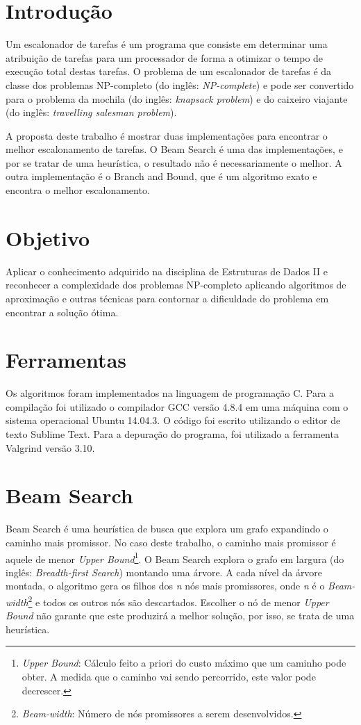 \documentclass[a4paper,12pt]{article}
\begin{document}
\section{Introdução} %

Um escalonador de tarefas é um programa que consiste em determinar uma atribuição de tarefas para um processador
de forma a otimizar o tempo de execução total destas tarefas. O problema de um escalonador de tarefas é da classe dos 
problemas NP-completo (do inglês: \textit{NP-complete}) e pode ser convertido para o problema da 
mochila (do inglês: \textit{knapsack problem}) e do caixeiro viajante (do inglês: \textit{travelling salesman problem}).

A proposta deste trabalho é mostrar duas implementações para encontrar o melhor escalonamento de tarefas. O Beam Search 
é uma das implementações, e por se tratar de uma heurística, o resultado não é necessariamente o melhor. A outra 
implementação é o Branch and Bound, que é um algoritmo exato e encontra o melhor escalonamento.

\section{Objetivo}
Aplicar o conhecimento adquirido na disciplina de Estruturas de Dados II e reconhecer a complexidade dos 
problemas NP-completo aplicando algoritmos de aproximação e outras técnicas para contornar a dificuldade do 
problema em encontrar a solução ótima.

\section{Ferramentas}
Os algoritmos foram implementados na linguagem de programação C. Para a compilação foi 
utilizado o compilador GCC versão 4.8.4 em uma máquina com o sistema operacional Ubuntu 14.04.3.
O código foi escrito utilizando o editor de texto Sublime Text.
Para a depuração do programa, foi utilizado a ferramenta Valgrind versão 3.10.


\section{Beam Search}
Beam Search é uma heurística de busca que explora um grafo expandindo o caminho mais promissor. No caso deste 
trabalho, o caminho mais promissor é aquele de menor \emph{Upper Bound}\footnote{\emph{Upper Bound}: Cálculo 
feito a priori do custo máximo que um caminho pode obter. A medida que o caminho vai sendo percorrido, este 
valor pode decrescer.}. O Beam Search explora o grafo em largura (do inglês: \textit{Breadth-first Search}) 
montando uma árvore. A cada nível da árvore montada, o algoritmo gera os filhos dos \emph{n} nós mais promissores, 
onde \emph{n} é o \emph{Beam-width}\footnote{\emph{Beam-width}: Número de nós promissores a serem desenvolvidos.} e 
todos os outros nós são descartados. Escolher o nó de menor \emph{Upper Bound} não garante que este produzirá a 
melhor solução, por isso, se trata de uma heurística.
\end{document}
